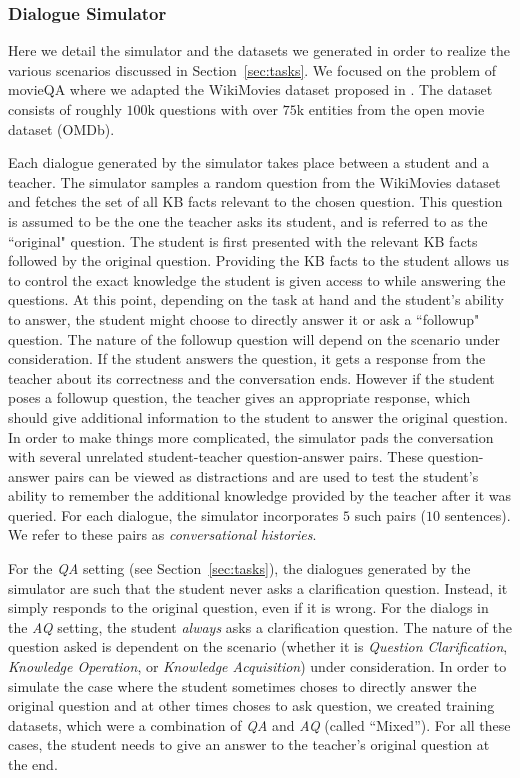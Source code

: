 \subsubsection{Dialogue Simulator}
Here we  detail 
the simulator and 
the datasets we generated in order to realize the various scenarios 
discussed in Section~\ref{sec:tasks}. 
We focused on the problem of movieQA where we adapted the 
WikiMovies dataset proposed in \cite{weston2015towards}. The 
dataset consists of roughly $100$k questions with over $75$k entities 
from the open movie dataset (OMDb). 

Each dialogue generated by the simulator takes place between 
a student and a teacher.
The simulator samples a random question from the 
WikiMovies dataset and fetches the set of all KB facts
relevant to the chosen question. This question is assumed 
to be the one the teacher asks its student, and is referred to as 
the ``original" question. The student is first presented with the 
relevant KB facts followed by the original question. Providing the 
KB facts to the student allows us to control the exact knowledge 
the student is given access to while answering the questions. 
At this point, depending on the 
task at hand and the student's ability to answer, the 
student might choose to directly answer it or ask a ``followup"
question. The nature of the followup question will depend on 
the scenario under consideration. If the student 
answers the question, it gets a response from the teacher about 
its correctness and the conversation ends. However if the student 
poses a followup question, the teacher gives an appropriate 
response, which should give additional information to the student 
to answer the original question. In order to make things more 
complicated, the simulator pads the 
conversation with several unrelated student-teacher 
question-answer pairs. These question-answer pairs can be 
viewed as distractions and are 
used to test the student's ability to remember the additional 
knowledge provided by the teacher after it was queried. 
For each dialogue, the simulator incorporates $5$ such pairs 
($10$ sentences). We refer to these pairs as \emph{conversational 
histories}. 

For the \emph{QA} setting (see Section~\ref{sec:tasks}), the 
dialogues generated by the simulator are such that the student 
never asks a clarification question. Instead, it simply responds 
to the original question, even if it is wrong. For the dialogs in 
the \emph{AQ} setting, the student {\em always} asks a clarification 
question. The nature of the question asked is dependent on 
the scenario (whether it is 
\emph{Question Clarification}, 
\emph{Knowledge Operation}, or 
\emph{Knowledge Acquisition}) under consideration. 
In order to simulate the 
case where the student sometimes choses to directly answer 
the original question and at other times choses to ask question, 
we created training datasets, which were a combination of 
\emph{QA} and \emph{AQ} (called ``Mixed''). For all these cases, the student 
needs to give an answer to the teacher's original question at 
the end.



